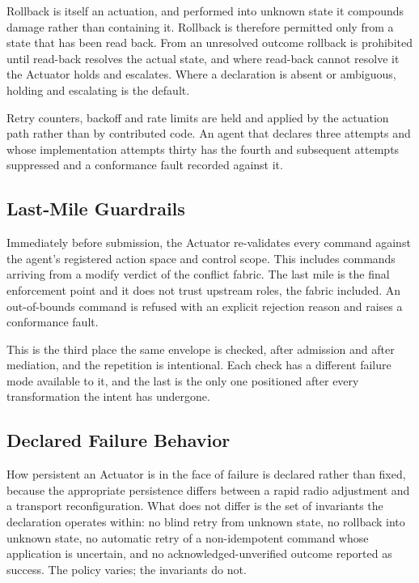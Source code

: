 Rollback is itself an actuation, and performed into unknown state it
compounds damage rather than containing it. Rollback is therefore
permitted only from a state that has been read back. From an unresolved
outcome rollback is prohibited until read-back resolves the actual
state, and where read-back cannot resolve it the Actuator holds and
escalates. Where a declaration is absent or ambiguous, holding and
escalating is the default.

Retry counters, backoff and rate limits are held and applied by the
actuation path rather than by contributed code. An agent that declares
three attempts and whose implementation attempts thirty has the fourth
and subsequent attempts suppressed and a conformance fault recorded
against it.

\hypertarget{last-mile-guardrails}{%
\subsection{Last-Mile Guardrails}\label{last-mile-guardrails}}

Immediately before submission, the Actuator re-validates every command
against the agent's registered action space and control scope. This
includes commands arriving from a modify verdict of the conflict fabric.
The last mile is the final enforcement point and it does not trust
upstream roles, the fabric included. An out-of-bounds command is refused
with an explicit rejection reason and raises a conformance fault.

This is the third place the same envelope is checked, after admission
and after mediation, and the repetition is intentional. Each check has a
different failure mode available to it, and the last is the only one
positioned after every transformation the intent has undergone.

\hypertarget{declared-failure-behavior-3}{%
\subsection{Declared Failure Behavior}\label{declared-failure-behavior-3}}

How persistent an Actuator is in the face of failure is declared rather
than fixed, because the appropriate persistence differs between a rapid
radio adjustment and a transport reconfiguration. What does not differ
is the set of invariants the declaration operates within: no blind retry
from unknown state, no rollback into unknown state, no automatic retry
of a non-idempotent command whose application is uncertain, and no
acknowledged-unverified outcome reported as success. The policy varies;
the invariants do not.

